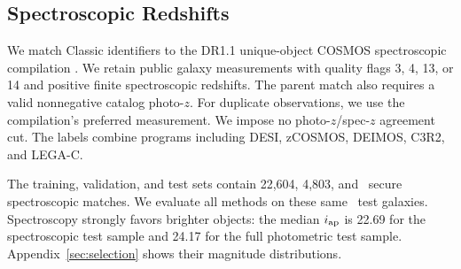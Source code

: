 \subsection{Spectroscopic Redshifts}
We match Classic identifiers to the DR1.1 unique-object COSMOS spectroscopic
compilation \citep{khostovan2025}. We retain public galaxy measurements with
quality flags 3, 4, 13, or 14 and positive finite spectroscopic redshifts.
The parent match also requires a valid nonnegative catalog photo-$z$.
For duplicate observations, we use the compilation's preferred measurement.
We impose no photo-$z$/spec-$z$ agreement cut. The labels combine programs
including DESI, zCOSMOS, DEIMOS, C3R2, and LEGA-C.

The training, validation, and test sets contain 22,604, 4,803, and \NTest\
secure spectroscopic matches. We evaluate all methods on these same
\NTest\ test galaxies. Spectroscopy strongly favors brighter objects:
the median $i_{\rm ap}$ is 22.69 for the spectroscopic test sample and
24.17 for the full photometric test sample. Appendix~\ref{sec:selection}
shows their magnitude distributions.

